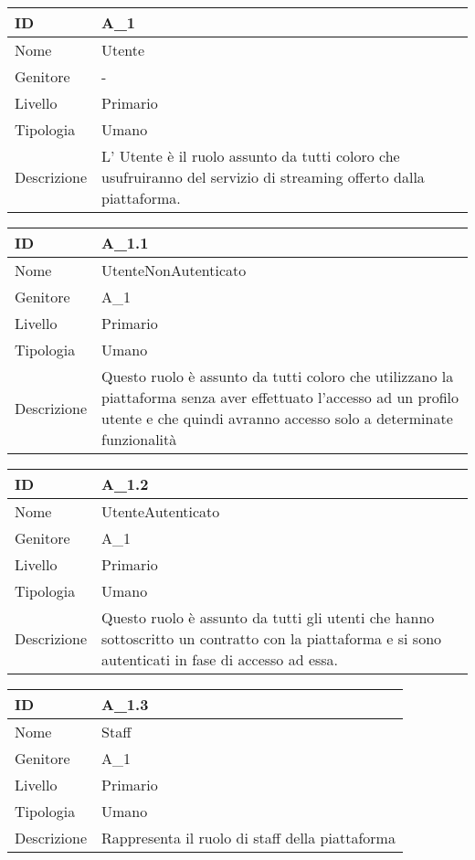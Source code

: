 \begin{center}

\begin{tabular}{ |p{2cm}|p{10cm}|  }
\hline
ID & A\_1 \\\hline
Nome & Utente\\\hline
Genitore & - \\\hline
Livello &  Primario \\\hline
Tipologia & Umano \\\hline
Descrizione &  L' Utente è il ruolo assunto da tutti coloro che usufruiranno del servizio di streaming offerto dalla piattaforma. \\\hline
\end{tabular}
\label{table_attore:1}\newline

\begin{tabular}{ |p{2cm}|p{10cm}|  }
\hline
ID & A\_1.1 \\\hline
Nome & UtenteNonAutenticato\\\hline
Genitore & A\_1 \\\hline
Livello &  Primario \\\hline
Tipologia & Umano \\\hline
Descrizione &  Questo ruolo è assunto da tutti coloro che utilizzano la piattaforma senza aver effettuato l'accesso ad un profilo utente e che quindi avranno accesso solo a determinate funzionalità \\\hline
\end{tabular}
\label{table_attore:1.1}\newline

\begin{tabular}{ |p{2cm}|p{10cm}|  }
\hline
ID & A\_1.2 \\\hline
Nome & UtenteAutenticato\\\hline
Genitore & A\_1 \\\hline
Livello &  Primario \\\hline
Tipologia & Umano \\\hline
Descrizione &  Questo ruolo è assunto da tutti gli utenti che hanno sottoscritto un contratto con la piattaforma e si sono autenticati in fase di accesso ad essa. \\\hline
\end{tabular}
\label{table_attore:1.2}\newline

\begin{tabular}{ |p{2cm}|p{10cm}|  }
\hline
ID & A\_1.3 \\\hline
Nome & Staff\\\hline
Genitore & A\_1\\\hline
Livello &  Primario \\\hline
Tipologia & Umano \\\hline
Descrizione &  Rappresenta il ruolo di staff della piattaforma \\\hline
\end{tabular}
\label{table_attore:1.3}\newline


\end{center}

